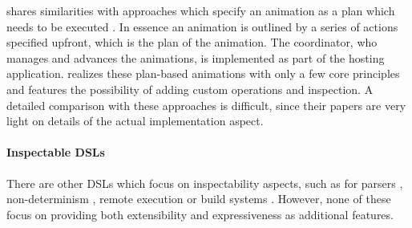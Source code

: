\dsl{} shares similarities with approaches which specify an animation as a plan
which needs to be executed
\cite{DBLP:conf/chi/KurlanderL95,DBLP:conf/eics/MirlacherPB12}. In essence an
animation is outlined by a series of actions specified upfront, which is the
plan of the animation. The coordinator, who manages and advances the
animations, is implemented as part of the hosting application. \dsl{} realizes
these plan-based animations with only a few core principles and features the
possibility of adding custom operations and inspection. A detailed comparison
with these approaches is difficult, since their papers are very light on
details of the actual implementation aspect.

\paragraph{Inspectable DSLs}

There are other DSLs which focus on inspectability aspects, such as for parsers
\cite{DBLP:journals/scp/Hughes00,DBLP:journals/corr/CapriottiK14,DBLP:conf/icfp/Lindley14},
non-determinism \cite{DBLP:journals/corr/abs-1905-06544}, remote execution
\cite{DBLP:conf/haskell/Gibbons16,DBLP:conf/haskell/GillSDEFGRSS15} or build
systems \cite{DBLP:journals/pacmpl/MokhovMJ18}. However, none of these 
focus on providing both extensibility and expressiveness as additional features.

